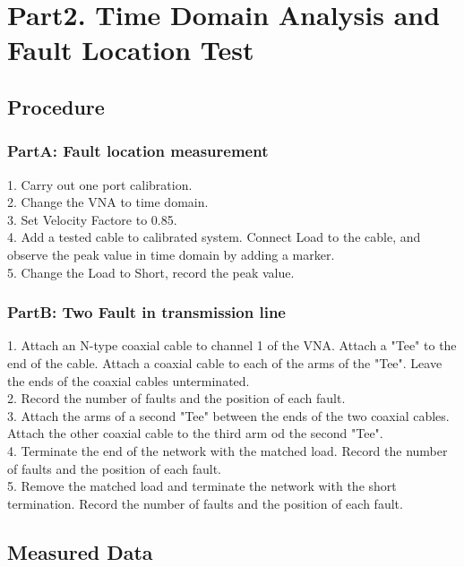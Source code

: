 \documentclass[11pt,oneside,a4paper]{report}
\begin{document}

\section*{Part2. Time Domain Analysis and Fault Location Test}
\subsection*{Procedure}
\subsubsection*{PartA: Fault location measurement}
1. Carry out one port calibration.\\
2. Change the VNA to time domain.\\
3. Set Velocity Factore to 0.85.\\
4. Add a tested cable to calibrated system. Connect Load to the cable, and observe the peak value in time domain by adding a marker.\\
5. Change the Load to Short, record the peak value.
\subsubsection*{PartB: Two Fault in transmission line}
1. Attach an N-type coaxial cable to channel 1 of the VNA. Attach a "Tee" to the end of the cable. Attach a coaxial cable to each of the arms of the "Tee". Leave the ends of the coaxial cables unterminated.\\
2. Record the number of faults and the position of each fault.\\
3. Attach the arms of a second "Tee" between the ends of the two coaxial cables. Attach the other coaxial cable to the third arm od the second "Tee".\\
4. Terminate the end of the network with the matched load. Record the number of faults and the position of each fault.\\
5. Remove the matched load and terminate the network with the short termination. Record the number of faults and the position of each fault.

\subsection*{Measured Data}
\end{document}
